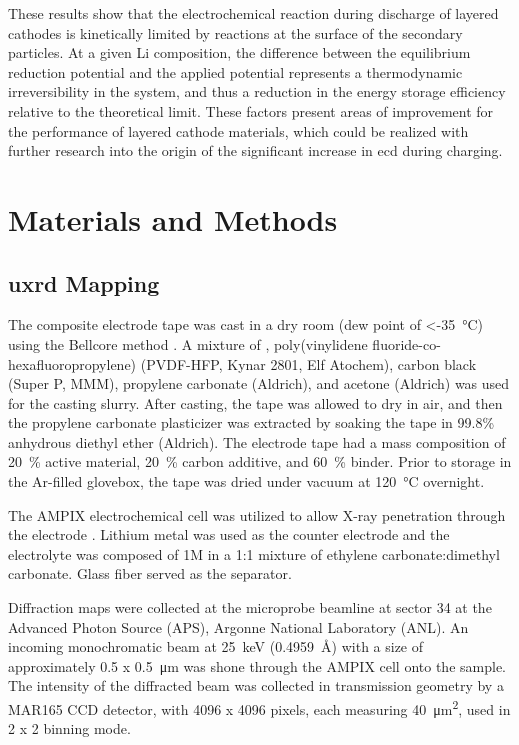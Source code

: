 \documentclass{article}
\begin{document}
These
  results show that the electrochemical reaction during discharge of
  layered cathodes is kinetically limited by reactions at the surface
  of the secondary particles. At a given Li composition, the
  difference between the equilibrium reduction potential and the
  applied potential represents a thermodynamic irreversibility in the
  system, and thus a reduction in the energy storage efficiency
  relative to the theoretical limit. These factors present areas of
improvement for the performance of layered cathode materials, which
could be realized with further research into the origin of the
significant increase in \gls{ecd} during charging.

\section*{Materials and Methods}
\label{sec:methods}

\subsection*{\gls{uxrd} Mapping}

The \nca{} composite electrode tape was cast in a dry room (dew point
of \SI{<-35}{\celsius}) using the Bellcore method \cite{warren1996}. A
mixture of \nca{}, poly(vinylidene fluoride-co-hexafluoropropylene)
(PVDF-HFP, Kynar 2801, Elf Atochem), carbon black (Super P, MMM),
propylene carbonate (Aldrich), and acetone (Aldrich) was used for the
casting slurry. After casting, the tape was allowed to dry in air, and
then the propylene carbonate plasticizer was extracted by soaking the
tape in 99.8\% anhydrous diethyl ether (Aldrich). The electrode tape
had a mass composition of \SI{20}{\percent} active material,
\SI{20}{\percent} carbon additive, and \SI{60}{\percent} binder. Prior
to storage in the Ar-filled glovebox, the tape was dried under vacuum
at \SI{120}{\celsius} overnight.

The AMPIX electrochemical cell was utilized to allow X-ray penetration
through the electrode \cite{borkiewicz2012}. Lithium metal was used as
the counter electrode and the electrolyte was composed of 1M
 in a 1:1 mixture of ethylene carbonate:dimethyl
carbonate. Glass fiber served as the separator.

Diffraction maps were collected at the microprobe beamline at sector
34 at the Advanced Photon Source (APS), Argonne National Laboratory
(ANL). An incoming monochromatic beam at \SI{25}{\kilo\electronvolt}
(\SI{0.4959}{\angstrom}) with a size of approximately \num{0.5} x
\SI{0.5}{\micro\meter} was shone through the AMPIX cell onto the
sample. The intensity of the diffracted beam was collected in
transmission geometry by a MAR165 CCD detector, with 4096 x 4096
pixels, each measuring \SI{40}{\square\micro\meter}, used in 2 x 2
binning mode.
\end{document}
